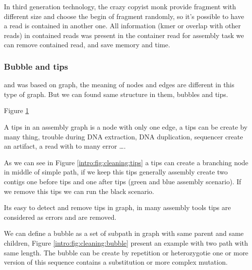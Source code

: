 \documentclass[main]{subfiles}
\begin{document}
In third generation technology, the crazy copyist monk provide fragment with different size and choose the begin of fragment randomly, so it's possible to have a read is contained in another one. All information (kmer or overlap with other reads) in contained reads was present in the container read for assembly task we can remove contained read, and save memory and time.

\subsubsection{Bubble and tips} \label{intro:subsubsec:bubble_tips}

\OLC and \DBG was based on graph, the meaning of nodes and edges are different in this type of graph. But we can found same structure in them, bubbles and tips.

Figure \ref{intro:fig:cleaning}

\begin{figure}[ht]
    \caption{}
    \label{intro:fig:cleaning}
\end{figure}

A tips in an assembly graph is a node with only one edge, a tips can be create by many thing, trouble during DNA extraction, DNA duplication, sequencer create an artifact, a read with to many error ….

As we can see in Figure \ref{intro:fig:cleaning:tips} a tips can create a branching node in middle of simple path, if we keep this tips generally assembly create two contigs one before tips and one after tips (green and blue assembly scenario). If we remove this tips we can run the black scenario.

Its easy to detect and remove tips in graph, in many assembly tools tips are considered as errors and are removed.

We can define a bubble as a set of subpath in graph with same parent and same children, Figure \ref{intro:fig:cleaning:bubble} present an example with two path with same length. The bubble can be create by repetition or heterozygotie one or more version of this sequence contains a substitution or more complex mutation.
\end{document}
